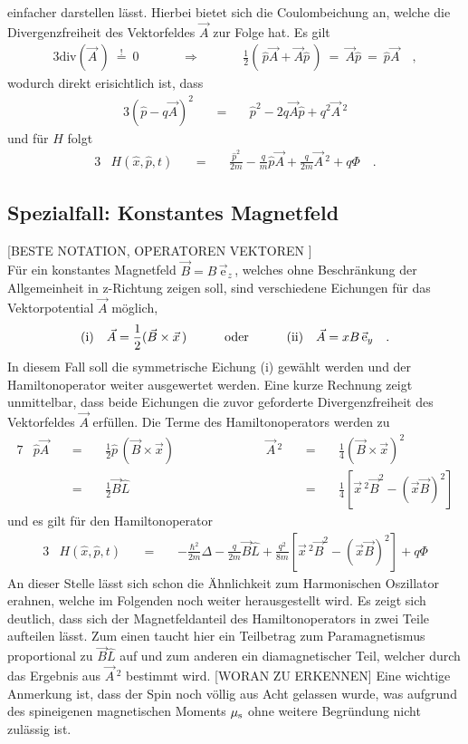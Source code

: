 \documentclass[a4paper,11pt]{article}
\newcommand{\+}{\dagger}
\renewcommand{\it}{\mathit}
\renewcommand{\v}{\vec}
\renewcommand{\^}{\hat}
\renewcommand{\tt}{\text}
\renewcommand{\~}{\widetilde}
\begin{document}
einfacher darstellen lässt. Hierbei bietet sich die Coulombeichung an, welche die Divergenzfreiheit des Vektorfeldes $\v A$ zur Folge hat. Es gilt
\begin{alignat*}{3}
\tt{div}(\v A\,) \ \stackrel{!}{=} \ 0 &&\qquad \Rightarrow \qquad && \frac{1}{2}(\,\^p\v A + \v A\^p\,)\ =\  \v A\^p \ =\ \^p \v A \quad ,
\end{alignat*}
wodurch direkt erisichtlich ist, dass  
\begin{alignat*}{3}
(\^p -q \v A)^2 && \ =\ && \^p ^2 -2q \v A \^ p +q^2\v A \,^2 
\end{alignat*}
und für $H$ folgt
\begin{alignat*}{3}
& H(\^ x,\^ p,t)&& \ =\  && \frac{\^ p ^2}{2m} - \frac{q}{m}\^ p\v A +\frac{q}{2m}\v A\,^2+q\Phi  \quad .
\end{alignat*}


\subsection{Spezialfall: Konstantes Magnetfeld}
[BESTE NOTATION, OPERATOREN VEKTOREN ]\\
Für ein konstantes Magnetfeld $\v{B} = B\,\v{\tt{e}}_z\,$, welches ohne Beschränkung der Allgemeinheit in z-Richtung zeigen soll, sind verschiedene Eichungen für das Vektorpotential $\v A$ möglich, 
\begin{alignat*}{3}
(\tt{i})\quad \v A = \frac{1}{2}(\v B \times \v x \,) && \qquad \tt{oder} \qquad &&(\tt{ii})\quad \v A = xB\,\v{\tt e}_y \quad .
\end{alignat*}
In diesem Fall soll die symmetrische Eichung (i) gewählt werden und der Hamiltonoperator weiter ausgewertet werden. Eine kurze Rechnung zeigt unmittelbar, dass beide Eichungen die zuvor geforderte Divergenzfreiheit des Vektorfeldes $\v A$ erfüllen. Die Terme des Hamiltonoperators werden zu
\begin{alignat*}{7}
& \^p\v A && \ = \ && \frac{1}{2}\^p\,(\v B \times \v x)  && \qquad\qquad && \v A \,^2 &&\ =\ && \frac{1}{4}(\v B \times \v x)^2\\[2pt]
& && \ = \ && \frac{1}{2}\v B \^L 										&& \qquad\qquad && 		&&\ =\ && \frac{1}{4}\left [\v x\,^2 \v B^2 - (\v x \v B)^2 \right ]
\end{alignat*}
und es gilt für den Hamiltonoperator
\begin{alignat*}{3}
& H(\^ x,\^ p,t)&& \ =\  && -\frac{\hbar^2}{2m}\Delta - \frac{q}{2m}\v B \^L  +\frac{q^2}{8m}\left [\v x\,^2 \v B^2 - (\v x \v B)^2 \right ] +q\it\Phi
\end{alignat*}
An dieser Stelle lässt sich schon die Ähnlichkeit zum Harmonischen Oszillator erahnen, welche im Folgenden noch weiter herausgestellt wird. Es zeigt sich deutlich, dass sich der Magnetfeldanteil des Hamiltonoperators in zwei Teile aufteilen lässt. Zum einen taucht hier ein Teilbetrag zum Paramagnetismus proportional zu $\v B \^ L$ auf und zum anderen ein diamagnetischer Teil, welcher durch das Ergebnis aus $\v A \,^2$ bestimmt wird. [WORAN ZU ERKENNEN] 
Eine wichtige Anmerkung ist, dass der Spin noch völlig aus Acht gelassen wurde, was aufgrund des spineigenen magnetischen Moments $\mu_\tt s$ ohne weitere Begründung nicht zulässig ist. 
\end{document}
